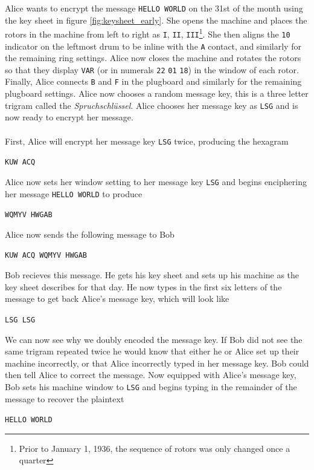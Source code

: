\noindent Alice wants to encrypt the message \texttt{HELLO WORLD} on
the 31st of the month using the key sheet in figure
\ref{fig:keysheet_early}. She opens the machine and places the rotors in
the machine from left to right as \texttt{I}, \texttt{II},
\texttt{III}\footnote{Prior to January 1, 1936, the sequence of
rotors was only changed once a quarter}. She then aligns the
\texttt{10} indicator on the
leftmost drum to be inline with the \texttt{A} contact, and similarly
for the remaining ring settings. Alice now closes the machine and
rotates the rotors so that they display \texttt{VAR} (or in numerals
\texttt{22} \texttt{01} \texttt{18}) in the window of
each rotor. Finally, Alice connects \texttt{B} and \texttt{F} in the
plugboard and similarly for the remaining plugboard settings. Alice
now chooses a random message key, this is a three letter trigram
called the \emph{Spruchschlüssel}. Alice chooses her message key as
\texttt{LSG} and is now ready to encrypt her message.
\\\\First, Alice will encrypt her message key \texttt{LSG} twice,
producing the hexagram
\begin{center}
  \texttt{KUW ACQ}
\end{center}
\noindent Alice now sets her window setting to her message key
\texttt{LSG} and begins enciphering her message \texttt{HELLO WORLD} to produce
\begin{center}
  \texttt{WQMYV HWGAB}
\end{center}
Alice now sends the following message to Bob
\begin{center}
  \texttt{KUW ACQ WQMYV HWGAB}
\end{center}
\noindent Bob recieves this message. He gets his key sheet and sets
up his machine as the key sheet describes for that day. He now types
in the first six letters of the message to get back Alice's message
key, which will look like
\begin{center}
  \texttt{LSG LSG}
\end{center}
We can now see why we doubly encoded the message key. If Bob did not
see the same trigram repeated twice he would know that either he or
Alice set up their machine incorrectly, or that Alice incorrectly typed in
her message key. Bob could then tell Alice to correct the message.
Now equipped with Alice's message key, Bob sets his machine window to
\texttt{LSG} and begins typing in the remainder of the message to
recover the plaintext
\begin{center}
  \texttt{HELLO WORLD}
\end{center}
